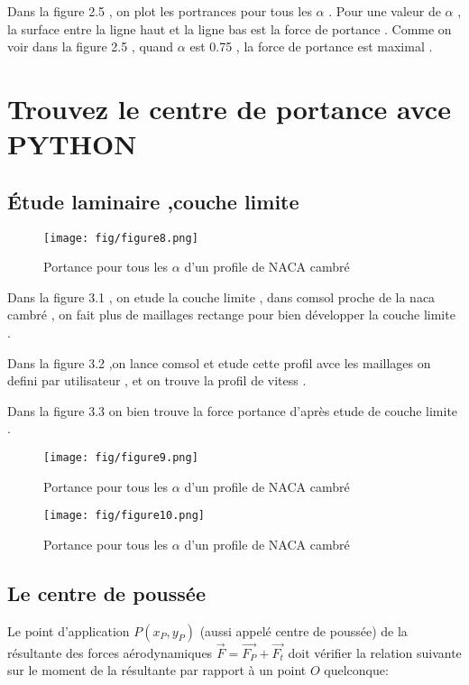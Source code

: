 \documentclass[a4paper,10pt]{report} %
\begin{document}
Dans la figure 2.5 , on plot les portrances pour tous les $\alpha$ . Pour une valeur de $\alpha$ , la surface entre la ligne haut et la ligne bas est la force de portance . Comme on voir dans la figure 2.5 , quand $\alpha$ est 0.75 , la force de portance est maximal .


\chapter{Trouvez le centre de portance avce PYTHON} 
\section{Étude laminaire ,couche limite}
\begin{figure}[h]
\centering
\texttt{[image: fig/figure8.png]}
\caption{	Portance pour tous les $\alpha$ d'un profile de NACA cambré}
\end{figure}
Dans la figure 3.1 , on etude la couche limite , dans comsol proche de la naca cambré , on fait plus de maillages rectange pour bien développer la couche limite .

Dans la figure 3.2 ,on lance comsol et etude cette profil avce les maillages on defini par utilisateur , et on trouve la profil de vitess .

Dans la figure 3.3 on bien trouve  la force portance d'après etude de couche limite .



\begin{figure}[h]
\centering
\texttt{[image: fig/figure9.png]}
\caption{	Portance pour tous les $\alpha$ d'un profile de NACA cambré}
\end{figure}


\begin{figure}[h]
\centering
\texttt{[image: fig/figure10.png]}
\caption{	Portance pour tous les $\alpha$ d'un profile de NACA cambré}
\end{figure}







\section{Le centre de poussée}
Le point d’application $P(x_{P},y_{P})$ (aussi appelé centre de poussée) de la résultante
des forces aérodynamiques $\vec{F}=\vec{F_{P}}+\vec{F_{t}}$ doit vérifier la relation suivante sur le moment de la résultante par rapport à un point $O$ quelconque:
\end{document}

